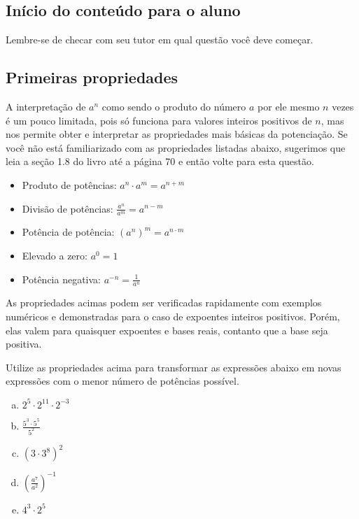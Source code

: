 \documentclass[main.tex]{subfiles}
\begin{document}
\subsection{Início do conteúdo para o aluno}

\paraAmbos

Lembre-se de checar com seu tutor em qual questão você deve começar.

\subsection*{Primeiras propriedades}

A interpretação de $a^n$ como sendo o produto do número $a$ por ele mesmo $n$ vezes é um pouco limitada, pois só funciona para valores inteiros positivos de $n$, mas nos permite obter e interpretar as propriedades mais básicas da potenciação. Se você não está familiarizado com as propriedades listadas abaixo, sugerimos que leia a seção 1.8 do livro  até a página 70 e então volte para esta questão.

\begin{caixaExemplo}
\begin{itemize}
 \item Produto de potências: $a^n \cdot a^m = a^{n+m}$
 \item Divisão de potências: $\frac{a^n}{a^m} = a^{n-m}$
 \item Potência de potência: $(a^n)^m = a^{n \cdot m}$
 \item Elevado a zero: $a^0 = 1$
 \item Potência negativa: $a^{-n} = \frac{1}{a^n}$
\end{itemize}
\end{caixaExemplo}

As propriedades acimas podem ser verificadas rapidamente com exemplos numéricos e demonstradas para o caso de expoentes inteiros positivos. Porém, elas valem para quaisquer expoentes e bases reais, contanto que a base seja positiva.

\begin{questao}
 Utilize as propriedades acima para transformar as expressões abaixo em novas expressões com o menor número de potências possível.
\begin{enumerate}[a)]
\item $2^5 \cdot 2^{11} \cdot 2^{-3}$
\item $\frac{5^3 \cdot 5^5}{5^2}$
\item $(3 \cdot 3^8)^2$
\item $(\frac{a^7}{a^2})^{-1}$
\item $4^3 \cdot 2^5$
\end{enumerate}
\end{questao}
\end{document}
